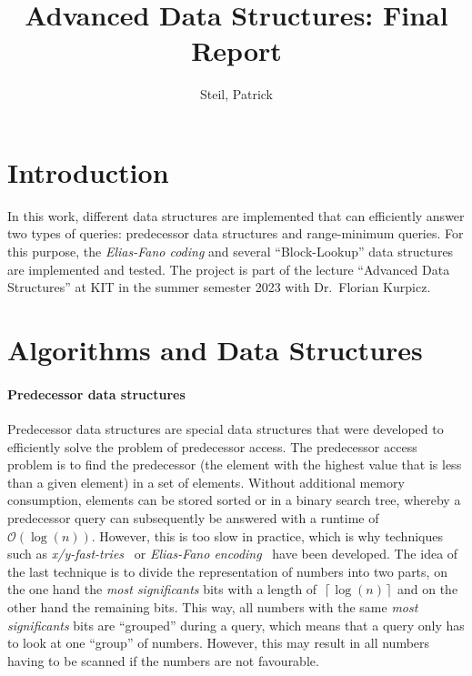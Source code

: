 \documentclass[a4paper,UKenglish,cleveref, autoref, thm-restate]{lipics-v2021}
\title{Advanced Data Structures: Final Report}
\author{Steil, Patrick}{2513240}{patrick.steil@student.kit.edu}{}{}
\begin{document}
	
	\maketitle
	
	\section{Introduction}
	\label{sec:introduction}
	
	In this work, different data structures are implemented that can efficiently answer two types of queries: predecessor data structures and range-minimum queries. For this purpose, the \textit{Elias-Fano coding} and several ``Block-Lookup'' data structures are implemented and tested.
	The project is part of the lecture ``Advanced Data Structures'' at KIT in the summer semester 2023 with Dr.~Florian Kurpicz.
	
	\section{Algorithms and Data Structures}
	\label{sec:algorithms}
	\paragraph*{Predecessor data structures}
	
	Predecessor data structures are special data structures that were developed to efficiently solve the problem of predecessor access. The predecessor access problem is to find the predecessor (the element with the highest value that is less than a given element) in a set of elements.
	Without additional memory consumption, elements can be stored sorted or in a binary search tree, whereby a predecessor query can subsequently be answered with a runtime of~$\mathcal{O}\left(\log(n)\right)$. However, this is too slow in practice, which is why techniques such as \textit{x/y-fast-tries}~\cite{WILLARD198381} or \textit{Elias-Fano encoding}~\cite{10.1145/321812.321820} have been developed. The idea of the last technique is to divide the representation of numbers into two parts, on the one hand the \textit{most significants} bits with a length of~$\left\lceil\log\left(n\right)\right\rceil$ and on the other hand the remaining bits. This way, all numbers with the same \textit{most significants} bits are ``grouped'' during a query, which means that a query only has to look at one ``group'' of numbers. However, this may result in all numbers having to be scanned if the numbers are not favourable.
	
\end{document}
